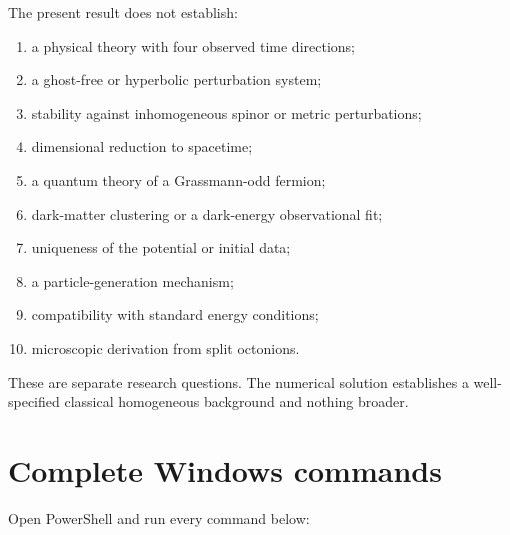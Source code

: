 \documentclass[11pt]{article}
\begin{document}
The present result does not establish:

\begin{enumerate}
\item a physical theory with four observed time directions;
\item a ghost-free or hyperbolic perturbation system;
\item stability against inhomogeneous spinor or metric perturbations;
\item dimensional reduction to \texttt{} spacetime;
\item a quantum theory of a Grassmann-odd fermion;
\item dark-matter clustering or a dark-energy observational fit;
\item uniqueness of the potential or initial data;
\item a particle-generation mechanism;
\item compatibility with standard energy conditions;
\item microscopic derivation from split octonions.
\end{enumerate}

These are separate research questions. The numerical solution establishes a well-specified classical homogeneous background and nothing broader.

\section{Complete Windows commands}

Open PowerShell and run every command below:
\end{document}
